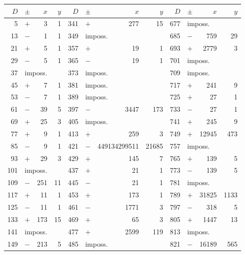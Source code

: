 \documentclass[11pt,a4paper]{book}
\theoremstyle{plain}
\begin{document}
\begin{center}
\footnotesize
\begin{tabular}{|r|c|r|r||r|c|r|r||r|c|r|r|}
\hline
$D$ & $\pm$ & $x$ & $y$ & $D$ & $\pm$ & $x$ & $y$ & $D$ & $\pm$ & $x$ & $y$ \\
\hline
5   & $+$ & 3 & 1     & 341 & $+$ & 277 & 15      & 677 & \multicolumn{3}{l|}{imposs.} \\
13  & $-$ & 1 & 1     & 349 & \multicolumn{3}{l||}{imposs.} & 685 & $-$ & 759 & 29 \\
21  & $+$ & 5 & 1     & 357 & $+$ & 19 & 1       & 693 & $+$ & 2779 & 3 \\
29  & $-$ & 5 & 1     & 365 & $-$ & 19 & 1       & 701 & \multicolumn{3}{l|}{imposs.} \\
37  & \multicolumn{3}{l||}{imposs.} & 373 & \multicolumn{3}{l||}{imposs.} & 709 & \multicolumn{3}{l|}{imposs.} \\
45  & $+$ & 7 & 1     & 381 & \multicolumn{3}{l||}{imposs.} & 717 & $+$ & 241 & 9 \\
53  & $-$ & 7 & 1     & 389 & \multicolumn{3}{l||}{imposs.} & 725 & $+$ & 27 & 1 \\
61  & $-$ & 39 & 5    & 397 & $-$ & 3447 & 173   & 733 & $-$ & 27 & 1 \\
69  & $+$ & 25 & 3    & 405 & \multicolumn{3}{l||}{imposs.} & 741 & $+$ & 245 & 9 \\
77  & $+$ & 9 & 1     & 413 & $+$ & 259 & 3      & 749 & $+$ & 12945 & 473 \\
85  & $-$ & 9 & 1     & 421 & $-$ & 449134299511 & 21685 & 757 & \multicolumn{3}{l|}{imposs.} \\
93  & $+$ & 29 & 3    & 429 & $+$ & 145 & 7      & 765 & $+$ & 139 & 5 \\
101 & \multicolumn{3}{l||}{imposs.} & 437 & $+$ & 21 & 1   & 773 & $-$ & 139 & 5 \\
109 & $-$ & 251 & 11  & 445 & $-$ & 21 & 1       & 781 & \multicolumn{3}{l|}{imposs.} \\
117 & $+$ & 11 & 1    & 453 & $+$ & 173 & 1      & 789 & $+$ & 31825 & 1133 \\
125 & $-$ & 11 & 1    & 461 & $-$ & 1771 & 3     & 797 & $-$ & 318 & 5 \\
133 & $+$ & 173 & 15  & 469 & $+$ & 65 & 3       & 805 & $+$ & 1447 & 13 \\
141 & \multicolumn{3}{l||}{imposs.} & 477 & $+$ & 2599 & 119 & 813 & \multicolumn{3}{l|}{imposs.} \\
149 & $-$ & 213 & 5   & 485 & \multicolumn{3}{l||}{imposs.} & 821 & $-$ & 16189 & 565 \\

\end{tabular}
\end{center}
\end{document}
